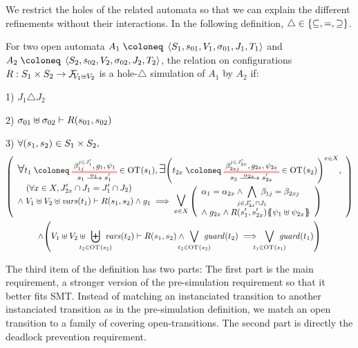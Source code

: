 \documentclass{article}
\begin{document}
We restrict the holes of the related automata so that we can explain the different refinements without their interactions.
In the following definition, \(\triangle \in \mbrc{\subseteq, =, \supseteq}\).
\begin{defi}
For two open automata \(A_1 \defobject \OAg[1]\) and \(A_2 \defobject \OAg[2]\), the relation on configurations \(R: S_1 \times S_2 \to \rformulas[V_1 \uplus V_2]\) is a hole-\(\triangle\) simulation of \(A_1\) by \(A_2\) if:
\item[1)] \(J_1 \triangle J_2\)
\item[2)] \(\sigma_{01} \uplus \sigma_{02} \vdash R\mpar{s_{01}, s_{02}}\)
\item[3)] \(\forall \mpar{s_1, s_2} \in S_1 \times S_2,\)\vspace{-8pt}
\noindent\begin{multline*}
	\mpar{\everymath{\displaystyle}\begin{array}{l}
		\bigsymb{\forall} t_1 \defobject \OTx{1}{}{1}{1} \in \fOT{s_1}, \bigsymb{\exists} \mpar{t_{2x} \defobject \OTx{2}{x}{2x}{2x} \in \fOT{s_2}}^{x \in X}, \\
		\quad \mpar{\forall x \in X, J'_{2x} \cap J_1 = J'_1 \cap J_2} \\[-10pt]
		\nwedge V_1 \uplus V_2 \uplus \fvars{t_1} \vdash R\mpar{s_1, s_2} \wedge g_1 \implies \operatorname*{\bigsymb{\bigvee}}_{x \in X} \mpar{\begin{array}{l}
			\alpha_1 = \alpha_{2x} \wedge \bigwedge_\subbox{j \in J'_{2x} \cap J_1} \beta_{1j} = \beta_{2xj} \\[12pt]
			\nwedge g_{2x} \wedge R\mpar{s'_1, s'_{2x}}\psubst{\psi_1 \uplus \psi_{2x}}
		\end{array}}
	\end{array}} \\
	\wedge \mpar{V_1 \uplus V_2 \uplus \biguplus_\subbox{t_2 \in \fOT{s_2}} \fvars{t_2} \vdash R\mpar{s_1, s_2} \wedge \bigvee_\subbox{t_2 \in \fOT{s_2}} \fguard{t_2} \implies \bigvee_\subbox{t_1 \in \fOT{s_1}} \fguard{t_1}}
\end{multline*}
\end{defi}
The third item of the definition has two parts:
The first part is the main requirement, a stronger version of the pre-simulation requirement so that it better fits SMT.
Instead of matching an instanciated transition to another instanciated transition as in the pre-simulation definition, we match an open transition to a family of covering open-transitions.
The second part is directly the deadlock prevention requirement.
\end{document}
